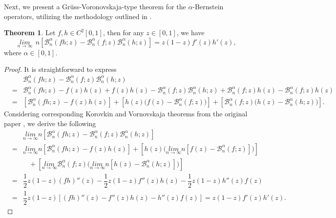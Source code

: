 \documentclass[preprint,12pt]{elsarticle}
\theoremstyle{definition}
\theoremstyle{theorem}
\newtheorem{theorem}{Theorem}
\theoremstyle{lemma}
\theoremstyle{example}
\theoremstyle{remark}
\theoremstyle{prop}
\begin{document}
Next, we  present a Grüss-Voronovskaja-type theorem for the $\alpha$-Bernstein operators, utilizing the methodology outlined in \cite{gal2014gr}.
\begin{theorem}
Let $f, h \in C^{2}[0, 1]$,  then for any $z \in [0, 1]$, we have 
\begin{equation}
\underset{n\rightarrow \infty}{lim}~~n \left [\mathcal{B}_n^{\alpha}(fh; z) -\mathcal{B}_n^{\alpha}(f; z)\mathcal{B}_n^{\alpha}(h; z)  \right ]= z(1-z){f}'(z){h}'(z),
\end{equation}
where $ \alpha\in [0,1]$.
\end{theorem}
\begin{proof}
It is straightforward to express
\begin{eqnarray*}
&&\mathcal{B}_n^{\alpha}(fh; z) -\mathcal{B}_n^{\alpha}(f; z)\mathcal{B}_n^{\alpha}(h; z)\\
&=&\mathcal{B}_n^{\alpha}(fh; z)-f\left ( z \right )h\left ( z \right )+f\left ( z \right )h\left ( z \right ) -\mathcal{B}_n^{\alpha}(f; z)\mathcal{B}_n^{\alpha}(h; z)+\mathcal{B}_n^{\alpha}(f; z)h\left ( z \right )-\mathcal{B}_n^{\alpha}(f; z)h\left ( z \right )\\
&=&\left [ \mathcal{B}_n^{\alpha}(fh; z)-f\left ( z \right )h\left ( z \right ) \right ]+\left [ h\left ( z \right ) \Big ( f(z)-\mathcal{B}_n^{\alpha}(f; z)\Big)  \right ]+\left [ \mathcal{B}_n^{\alpha}(f; z) \Big ( h(z)-\mathcal{B}_n^{\alpha}(h; z)\Big)  \right ].
\end{eqnarray*}
Considering corresponding Korovkin \cite{korovkin1953convergence} and Vornovskaja \cite{voronovskaja1932determination}  theorems from  the original paper \cite{chen2017approximation}, we derive the following
\begin{eqnarray*}
&&
\underset{n\rightarrow \infty}{lim} n \left[\mathcal{B}_n^{\alpha}(fh; z) -\mathcal{B}_n^{\alpha}(f; z)\mathcal{B}_n^{\alpha}(h; z)\right]\\
&=&
\underset{n\rightarrow \infty}{lim}n \left [ \mathcal{B}_n^{\alpha}(fh; z)-f\left ( z \right )h\left ( z \right ) \right ]+\left [ h\left ( z \right )
 \Big (\underset{n\rightarrow \infty}{lim} n [f(z)-\mathcal{B}_n^{\alpha}(f; z)]\Big)  \right ]\\
 &&~~~~+\left [ 
\underset{n\rightarrow \infty}{lim} \mathcal{B}_n^{\alpha}(f; z) 
 \Big (\underset{n\rightarrow \infty}{lim}n[ h(z)-\mathcal{B}_n^{\alpha}(h; z)]\Big)  \right ]\\
&=&\dfrac{1}{2}z(1- z)(fh)''(z)- \dfrac{1}{2}z(1- z){f}''(z)h\left ( z \right )-\dfrac{1}{2}z(1- z){h}''(z)f\left ( z \right )\\
&=&\dfrac{1}{2}z(1- z)\left [ (fh)''(z) -{f}''(z)h\left ( z \right ) -{h}''(z)f\left ( z \right )\right ]=z(1-z){f}'(z){h}'(z).
\end{eqnarray*}
\end{proof}
\end{document}
